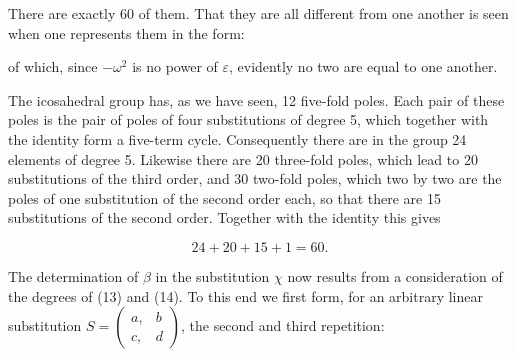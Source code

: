 There are exactly 60 of them. That they are all different
from one another is seen when one represents them in the form:





of which, since $-\omega^2$ is no power of $\varepsilon$, evidently no
two are equal to one another.

The icosahedral group has, as we have seen, 12 five-fold
poles. Each pair of these poles is the pair of poles of four substitutions
of degree 5, which together with the identity form a
five-term cycle. Consequently there are in the group
24 elements of degree 5. Likewise there are 20 three-fold poles,
which lead to 20 substitutions of the third order, and 30 two-fold
poles, which two by two are the poles of one substitution
of the second order each, so that there are 15 substitutions of the second
order. Together with the identity this gives

\[
24 + 20 + 15 + 1 = 60.
\]

The determination of $\beta$ in the substitution $\chi$ now results
from a consideration of the degrees of (13) and (14). To this end
we first form, for an arbitrary linear substitution $S = \begin{pmatrix} a, & b \\ c, & d \end{pmatrix}$,
the second and third repetition:

